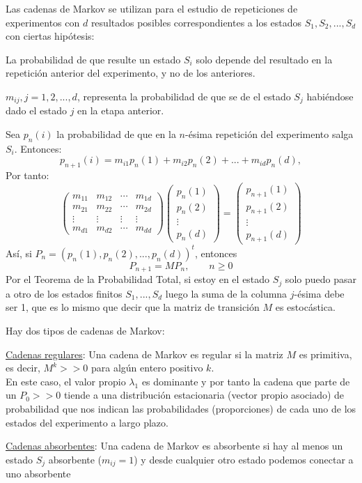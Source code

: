 Las cadenas de Markov se utilizan para el estudio de repeticiones de experimentos con $d$ resultados posibles correspondientes a los estados $S_{1},S_{2},...,S_{d}$ con ciertas hipótesis:
\begin{nlist}
\item La probabilidad de que resulte un estado $S_{i}$ solo depende del resultado en la repetición anterior del experimento, y no de los anteriores.
\item $m_{ij},j=1,2,...,d$, representa la probabilidad de que se de el estado $S_{j}$ habiéndose dado el estado $j$ en la etapa anterior.
\item Sea $p_{n}(i)$ la probabilidad de que en la $n$-ésima repetición del experimento salga $S_{i}$. Entonces:
$$ p_{n+1}(i)=m_{i1}p_{n}(1)+m_{i2}p_{n}(2)+...+m_{id}p_{n}(d),$$
Por tanto:
$$\begin{pmatrix}
m_{11} & m_{12} & \cdots & m_{1d} \\
m_{21} & m_{22} & \cdots & m_{2d} \\
\vdots & \vdots & \vdots & \vdots \\
m_{d1} & m_{d2} & \cdots & m_{dd}
\end{pmatrix}
\begin{pmatrix}
p_{n}(1) \\
p_{n}(2) \\
\vdots \\
p_{n}(d)
\end{pmatrix}
=
\begin{pmatrix}
p_{n+1}(1) \\
p_{n+1}(2) \\
\vdots \\
p_{n+1}(d)
\end{pmatrix}
$$
Así, si $P_{n}=(p_{n}(1),p_{n}(2),...,p_{n}(d))^{t}$, entonces
$$P_{n+1}=MP_{n}, \qquad n\geq 0$$
Por el Teorema de la Probabilidad Total, si estoy en el estado $S_{j}$ solo puedo pasar a otro de los estados finitos $S_{1},...,S_{d}$ luego la suma de la columna $j$-ésima debe ser 1, que es lo mismo que decir que la matriz de transición $M$ es estocástica.
\end{nlist}

Hay dos tipos de cadenas de Markov:
\begin{nlist}
\item \underline{Cadenas regulares}: Una cadena de Markov es regular si la matriz $M$ es primitiva, es decir, $M^{k}>>0$ para algún entero positivo $k$. \\
En este caso, el valor propio $\lambda_{1}$ es dominante y por tanto la cadena que parte de un $P_{0}>>0$ tiende a una distribución estacionaria (vector propio asociado) de probabilidad que nos indican las probabilidades (proporciones) de cada uno de los estados del experimento a largo plazo.
\item \underline{Cadenas absorbentes}: Una cadena de Markov es absorbente si hay al menos un estado $S_{j}$ absorbente ($m_{ij}=1$) y desde cualquier otro estado podemos conectar a uno absorbente
\end{nlist}

